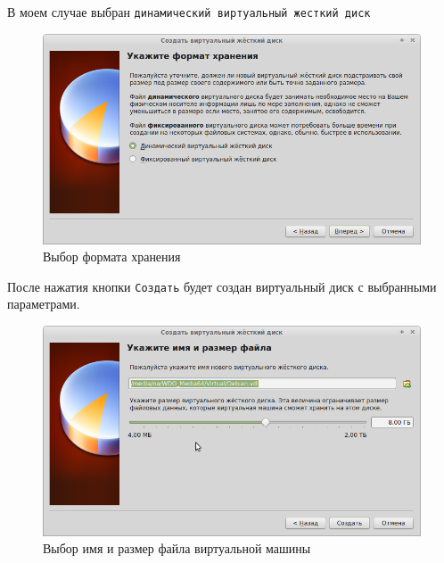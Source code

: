 \documentclass[12pt,a4paper]{article}
\begin{document}
В моем случае выбран \verb+динамический виртуальный жесткий диск+
\begin{figure}[h!]
\centering
\includegraphics[scale=0.45]{res/StorageFormat}
\caption{Выбор формата хранения}
\end{figure}

После нажатия кнопки \verb+Создать+  будет создан виртуальный диск с выбранными параметрами.

\begin{figure}[h!]
\centering
\includegraphics[scale=0.45]{res/WhereToInstall}
\caption{Выбор имя и размер файла виртуальной машины}
\end{figure}
\newpage
\end{document}
